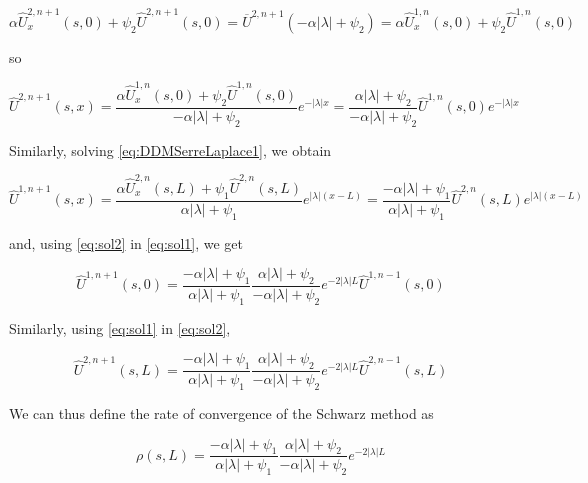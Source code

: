  \begin{equation*}
 \alpha \hat{U}_x^{2,n+1}(s,0) + \psi_2 \hat{U}^{2,n+1}(s,0) = \overline{U}^{2,n+1}(-\alpha|\lambda| + \psi_2) = \alpha \hat{U}_x^{1,n}(s,0) + \psi_2 \hat{U}^{1,n}(s,0)
 \end{equation*}
 
 \noindent so
 
 \begin{equation}
 \label{eq:sol2}
 	\hat{U}^{2,n+1}(s,x) = \frac{\alpha \hat{U}_x^{1,n}(s,0) + \psi_2 \hat{U}^{1,n}(s,0)}{-\alpha|\lambda| + \psi_2} e^{-|\lambda|x} = \frac{\alpha|\lambda| + \psi_2}{-\alpha|\lambda| + \psi_2} \hat{U}^{1,n}(s,0) e^{-|\lambda|x}
 \end{equation}
 
 \indent Similarly, solving \eqref{eq:DDMSerreLaplace1}, we obtain
 
  \begin{equation}
  \label{eq:sol1}
 	\hat{U}^{1,n+1}(s,x) = \frac{\alpha \hat{U}_x^{2,n}(s,L) + \psi_1 \hat{U}^{2,n}(s,L)}{\alpha|\lambda| + \psi_1} e^{|\lambda|(x-L)} = \frac{-\alpha |\lambda| + \psi_1 }{\alpha|\lambda| + \psi_1}\hat{U}^{2,n}(s,L) e^{|\lambda|(x-L)}
 \end{equation}
 
 \noindent and, using \eqref{eq:sol2} in \eqref{eq:sol1}, we get
 
\begin{equation}
 	\hat{U}^{1,n+1}(s,0) = \frac{-\alpha |\lambda| + \psi_1 }{\alpha|\lambda| + \psi_1} \frac{\alpha|\lambda| + \psi_2}{-\alpha|\lambda| + \psi_2} e^{-2|\lambda|L}\hat{U}^{1,n-1}(s,0) 
 \end{equation}
 
 \indent Similarly, using \eqref{eq:sol1} in \eqref{eq:sol2}, 
 
 \begin{equation}
 	\hat{U}^{2,n+1}(s,L) = \frac{-\alpha |\lambda| + \psi_1 }{\alpha|\lambda| + \psi_1} \frac{\alpha|\lambda| + \psi_2}{-\alpha|\lambda| + \psi_2}  e^{-2|\lambda|L}\hat{U}^{2,n-1}(s,L)
 \end{equation}
 
 \indent We can thus define the rate of convergence of the Schwarz method as
 
 \begin{equation}
 \label{eq:rateCV}
 \rho(s,L) = \frac{-\alpha |\lambda| + \psi_1 }{\alpha|\lambda| + \psi_1} \frac{\alpha|\lambda| + \psi_2}{-\alpha|\lambda| + \psi_2}  e^{-2|\lambda|L}
 \end{equation}
 
